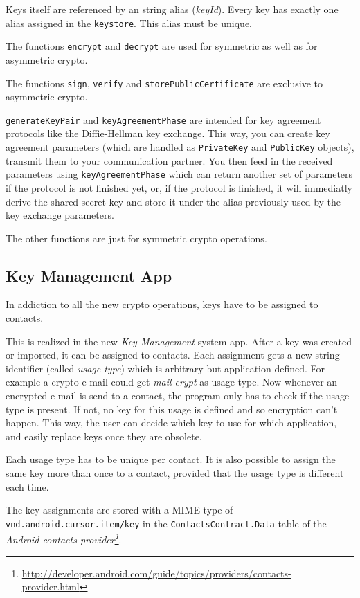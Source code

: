 \documentclass[a4paper,draft]{scrartcl}
\begin{document}
		Keys itself are referenced by an string alias (\emph{keyId}). Every key has exactly one alias assigned in the \texttt{keystore}. This alias must be unique.
	
		The functions \texttt{encrypt} and \texttt{decrypt} are used for symmetric as well as for asymmetric crypto.

		The functions \texttt{sign}, \texttt{verify} and \texttt{storePublicCertificate} are exclusive to asymmetric crypto.

		\texttt{generateKeyPair} and \texttt{keyAgreementPhase} are intended for key agreement protocols like the Diffie-Hellman key exchange. This way, you can create key agreement parameters (which are handled as \texttt{PrivateKey} and \texttt{PublicKey} objects), transmit them to your communication partner. You then feed in the received parameters using \texttt{keyAgreementPhase} which can return another set of parameters if the protocol is not finished yet, or, if the protocol is finished, it will immediatly derive the shared secret key and store it under the alias previously used by the key exchange parameters.

		The other functions are just for symmetric crypto operations.
	
	\subsection{Key Management App}
		In addiction to all the new crypto operations, keys have to be assigned to contacts.

		This is realized in the new {\em Key Management} system app. After a key was created or imported, it can be assigned to contacts. Each assignment gets a new string identifier (called {\em usage type}) which is arbitrary but application defined. For example a crypto e-mail could get \textit{mail-crypt} as usage type. Now whenever an encrypted e-mail is send to a contact, the program only has to check if the usage type is present. If not, no key for this usage is defined and so encryption can't happen. This way, the user can decide which key to use for which application, and easily replace keys once they are obsolete.
		
		Each usage type has to be unique per contact. It is also possible to assign the same key more than once to a contact, provided that the usage type is different each time.

		The key assignments are stored with a MIME type of \texttt{vnd.android.cursor.item/key} in the \texttt{ContactsContract.Data} table of the {\em Android contacts provider\footnote{\url{http://developer.android.com/guide/topics/providers/contacts-provider.html}}}.
		
\end{document}
